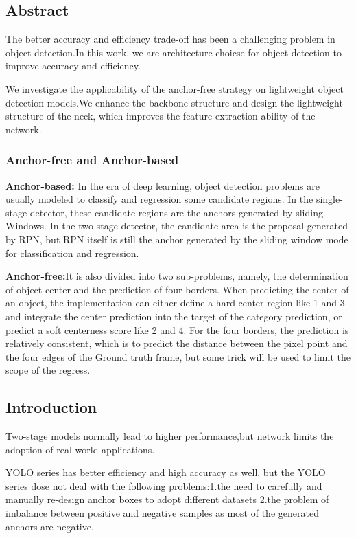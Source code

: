 \documentclass[11pt]{article}
\begin{document}
\subsection{Abstract}

The better accuracy and efficiency trade-off has been a challenging problem in object detection.In this work, we are architecture choicse for object detection to improve accuracy and efficiency.

We investigate the applicability of the anchor-free strategy on lightweight object detection models.We enhance the backbone structure and design the lightweight structure of the neck, which improves the feature extraction ability of the network.

\subsubsection{Anchor-free and Anchor-based}
\textbf{Anchor-based:} In the era of deep learning, object detection problems are usually modeled to classify and regression some candidate regions. In the single-stage detector, these candidate regions are the anchors generated by sliding Windows. In the two-stage detector, the candidate area is the proposal generated by RPN, but RPN itself is still the anchor generated by the sliding window mode for classification and regression.

\textbf{Anchor-free:}It is also divided into two sub-problems, namely, the determination of object center and the prediction of four borders. When predicting the center of an object, the implementation can either define a hard center region like 1 and 3 and integrate the center prediction into the target of the category prediction, or predict a soft centerness score like 2 and 4. For the four borders, the prediction is relatively consistent, which is to predict the distance between the pixel point and the four edges of the Ground truth frame, but some trick will be used to limit the scope of the regress.
\subsection{Introduction}
Two-stage models normally lead to higher performance,but network limits the adoption of real-world applications.

YOLO series has better efficiency and high accuracy as well, but the YOLO series dose not deal with the following problems:1.the need to carefully and manually re-design anchor boxes to adopt different datasets 2.the problem of imbalance between positive and negative samples as most of the generated anchors are negative.
\end{document}
